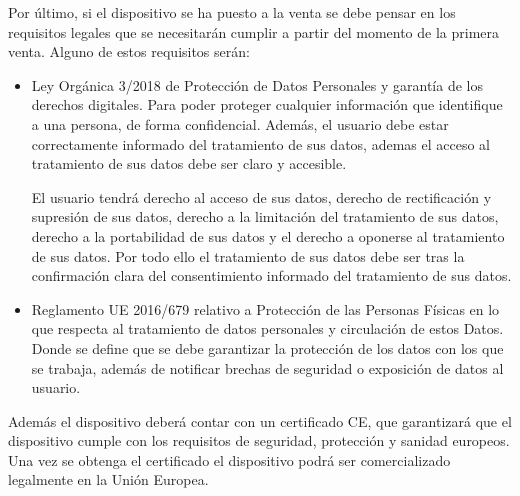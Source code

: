 Por último, si el dispositivo se ha puesto a la venta se debe pensar en los requisitos legales que se necesitarán cumplir a partir del momento de la primera venta. Alguno de estos requisitos serán:
\begin{itemize}
    \item Ley Orgánica 3/2018\cite{protDatos} de Protección de Datos Personales y garantía de los derechos digitales. Para poder proteger cualquier información que identifique a una persona, de forma confidencial. Además, el usuario debe estar correctamente informado del tratamiento de sus datos, ademas el acceso al tratamiento de sus datos debe ser claro y accesible.

    El usuario tendrá derecho al acceso de sus datos, derecho de rectificación y supresión de sus datos, derecho a la limitación del tratamiento de sus datos, derecho a la portabilidad de sus datos y el derecho a oponerse al tratamiento de sus datos. Por todo ello el tratamiento de sus datos debe ser tras la confirmación clara del consentimiento informado del tratamiento de sus datos.

    \item Reglamento UE 2016/679\cite{protDatosEU} relativo a Protección de las Personas Físicas en lo que respecta al tratamiento de datos personales y circulación de estos Datos. Donde se define que se debe garantizar la protección de los datos con los que se trabaja, además de notificar brechas de seguridad o exposición de datos al usuario.
\end{itemize}


Además el dispositivo deberá contar con un certificado CE\cite{certificadoEuropeo}, que garantizará que el dispositivo cumple con los requisitos de seguridad, protección y sanidad europeos. Una vez se obtenga el certificado el dispositivo podrá ser comercializado legalmente en la Unión Europea.
